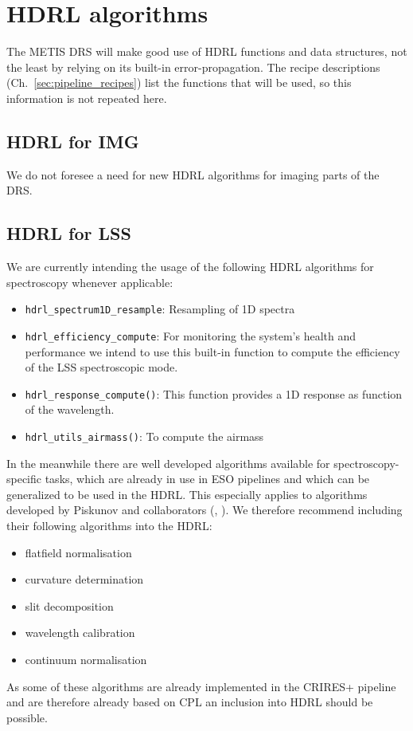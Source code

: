 \clearpage
\section{HDRL algorithms}\label{sec:hdrl_algorithms}

The METIS \ac{DRS} will make good use of \ac{HDRL} functions and data structures, not
the least by relying on its built-in error-propagation. The recipe descriptions
(Ch.~\ref{sec:pipeline_recipes}) list the functions that will be used, so this
information is not repeated here.

\subsection{HDRL for IMG}\label{ssec:hdrlimg}

We do not foresee a need for new \ac{HDRL} algorithms for imaging parts of the \ac{DRS}.


\subsection{HDRL for LSS}\label{ssec:hdrllss}
We are currently intending the usage of the following \ac{HDRL} algorithms for spectroscopy whenever applicable:
\begin{itemize}
    \item \texttt{hdrl\_spectrum1D\_resample}: Resampling of 1D spectra
    \item \texttt{hdrl\_efficiency\_compute}: For monitoring the system's health and performance we intend to use this built-in function to compute the efficiency of the \ac{LSS} spectroscopic mode.
    \item \texttt{hdrl\_response\_compute()}: This function provides a 1D response as function of the wavelength. 
    \item \texttt{hdrl\_utils\_airmass()}: To compute the airmass
\end{itemize}

In the meanwhile there are well developed algorithms available for spectroscopy-specific tasks, which are already in use in ESO pipelines and which can be generalized to be used in the \ac{HDRL}. This especially applies to algorithms developed by Piskunov and collaborators (\cite{pis21}, \cite{pis02}). We therefore recommend including their following algorithms into the \ac{HDRL}:
\begin{itemize}
    \item flatfield normalisation
    \item curvature determination
    \item slit decomposition
    \item wavelength calibration
    \item continuum normalisation
\end{itemize}
As some of these algorithms are already implemented in the \ac{CRIRES}+ pipeline
and are therefore already based on \ac{CPL} an inclusion into \ac{HDRL} should
be possible.

